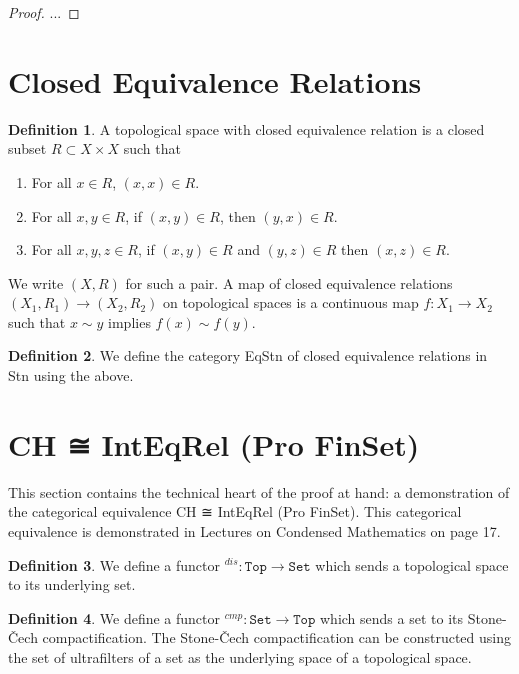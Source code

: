 \documentclass[13pt]{amsart}
\theoremstyle{definition}
\newtheorem{definition}{Definition}
\begin{document}
\begin{proof}
...
\end{proof}




\section{Closed Equivalence Relations}

\begin{definition}
A topological space with closed equivalence relation is a closed subset $R \subset X \times X$ such that
\begin{enumerate}
\item For all $x \in R$, $(x, x) \in R$.
\item For all $x, y \in R$, if $(x, y) \in R$, then $(y, x) \in R$.
\item For all $x, y, z \in R$, if $(x,y) \in R$ and $(y, z) \in R$ then $(x, z) \in R$.
\end{enumerate}
We write $(X,R)$ for such a pair. A map of closed equivalence relations $(X_1,R_1) \rightarrow (X_2,R_2)$ on topological spaces is a continuous map $f : X_1 \rightarrow X_2$ such that $x \sim y$ implies $f(x) \sim f(y)$.
\end{definition}

\begin{definition}
We define the category EqStn of closed equivalence relations in Stn using the above.
\end{definition}

\section{CH ≅ IntEqRel (Pro FinSet)}

This section contains the technical heart of the proof at hand: a demonstration of the categorical equivalence CH ≅ IntEqRel (Pro FinSet). This categorical equivalence is demonstrated in Lectures on Condensed Mathematics on page 17.\\

\begin{definition}
We define a functor ${}^{dis} : \texttt{Top} \rightarrow \texttt{Set}$ which sends a topological space to its underlying set.
\end{definition}

\begin{definition}
We define a functor ${}^{cmp} : \texttt{Set} \rightarrow \texttt{Top}$ which sends a set to its Stone-Čech compactification. The Stone-Čech compactification can be constructed using the set of ultrafilters of a set as the underlying space of a topological space.
\end{definition}
\end{document}
